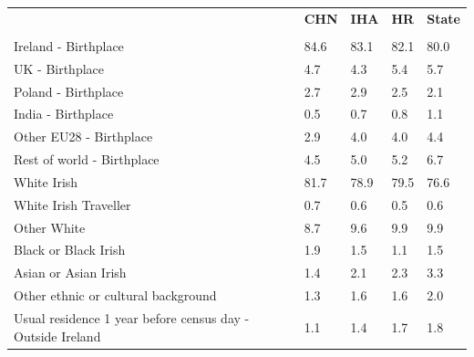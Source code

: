 \documentclass{article}
\begin{document}
\pagebreak
\begin{table}[h]	
\centering
		\begin{tabular}{KTTTT}
  \hline
& \textbf{CHN} & \textbf{IHA} & \textbf{HR}& \textbf{State}\\ 
  \hline
    \\ 
    \hline
Ireland - Birthplace & 84.6& 83.1& 82.1& 80.0\\
UK - Birthplace & 4.7& 4.3& 5.4& 5.7\\
Poland - Birthplace & 2.7& 2.9& 2.5& 2.1\\
India - Birthplace & 0.5& 0.7& 0.8& 1.1\\
Other EU28 - Birthplace & 2.9& 4.0& 4.0& 4.4\\
Rest of world - Birthplace & 4.5& 5.0& 5.2& 6.7\\
    \hline
White Irish & 81.7& 78.9& 79.5& 76.6\\
White Irish Traveller & 0.7& 0.6& 0.5& 0.6\\
Other White & 8.7& 9.6& 9.9& 9.9\\
Black or Black Irish & 1.9& 1.5& 1.1& 1.5\\
Asian or Asian Irish & 1.4& 2.1& 2.3& 3.3\\
Other ethnic or cultural background & 1.3& 1.6& 1.6& 2.0\\
    \hline
Usual residence 1 year before census day - Outside Ireland & 1.1& 1.4& 1.7& 1.8\\


\end{tabular}
\end{table}
\end{document}
